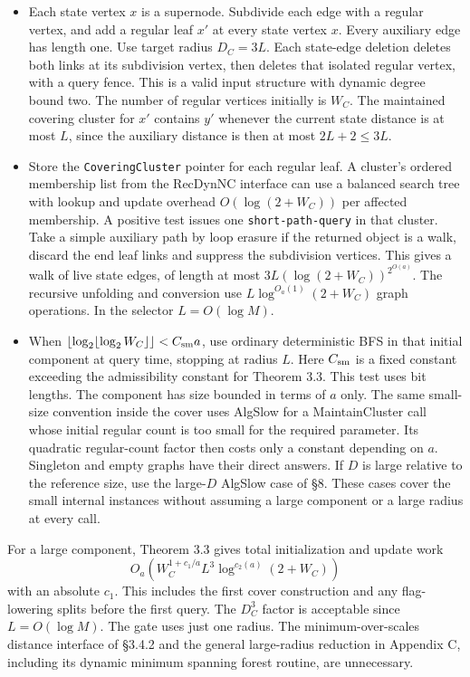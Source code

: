 \documentclass[11pt]{article}
\providecommand{\tightlist}{\setlength{\itemsep}{0pt}\setlength{\parskip}{0pt}}
\begin{document}
\begin{itemize}
\tightlist
\item
  Each state vertex \(x\) is a supernode. Subdivide each edge with a regular vertex, and add a regular leaf \(x'\) at every state vertex \(x\). Every auxiliary edge has length one. Use target radius \(D_C=3L\). Each state-edge deletion deletes both links at its subdivision vertex, then deletes that isolated regular vertex, with a query fence. This is a valid input structure with dynamic degree bound two. The number of regular vertices initially is \(W_C\). The maintained covering cluster for \(x'\) contains \(y'\) whenever the current state distance is at most \(L\), since the auxiliary distance is then at most \(2L+2\le3L\).
\item
  Store the \texttt{CoveringCluster} pointer for each regular leaf. A cluster's ordered membership list from the RecDynNC interface can use a balanced search tree with lookup and update overhead \(O(\log(2+W_C))\) per affected membership. A positive test issues one \texttt{short-path-query} in that cluster. Take a simple auxiliary path by loop erasure if the returned object is a walk, discard the end leaf links and suppress the subdivision vertices. This gives a walk of live state edges, of length at most \(3L(\log(2+W_C))^{2^{O(a)}}\). The recursive unfolding and conversion use \(L\log^{O_a(1)}(2+W_C)\) graph operations. In the selector \(L=O(\log M)\).
\item
  When \(\lfloor\log_2\lfloor\log_2 W_C\rfloor\rfloor<C_{\rm sm}a\), use ordinary deterministic BFS in that initial component at query time, stopping at radius \(L\). Here \(C_{\rm sm}\) is a fixed constant exceeding the admissibility constant for Theorem 3.3. This test uses bit lengths. The component has size bounded in terms of \(a\) only. The same small-size convention inside the cover uses AlgSlow for a MaintainCluster call whose initial regular count is too small for the required parameter. Its quadratic regular-count factor then costs only a constant depending on \(a\). Singleton and empty graphs have their direct answers. If \(D\) is large relative to the reference size, use the large-\(D\) AlgSlow case of §8. These cases cover the small internal instances without assuming a large component or a large radius at every call.
\end{itemize}

For a large component, Theorem 3.3 gives total initialization and update work
\[
 O_a\!\left(W_C^{1+c_1/a}L^3\log^{c_2(a)}(2+W_C)\right)
\tag{A}
\]
with an absolute \(c_1\). This includes the first cover construction and any flag-lowering splits before the first query. The \(D_C^3\) factor is acceptable since \(L=O(\log M)\). The gate uses just one radius. The minimum-over-scales distance interface of §3.4.2 and the general large-radius reduction in Appendix C, including its dynamic minimum spanning forest routine, are unnecessary.
\end{document}
